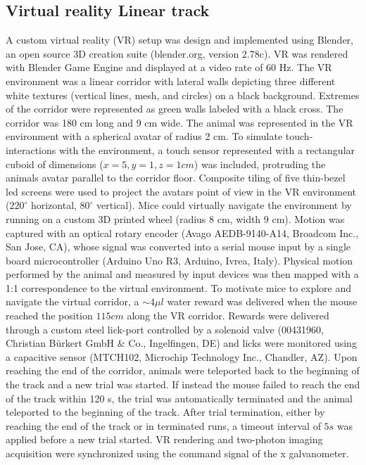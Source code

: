 \subsection{Virtual reality Linear track}
\label{chap3:sec:3:subsec1:linear-track-tracking}
A custom virtual reality (VR) setup was design and implemented using Blender, an open source 3D creation suite (blender.org, version 2.78c). 
VR was rendered with Blender Game Engine and displayed at a video rate of 60 Hz. 
The VR environment was a linear corridor with lateral walls depicting three different white textures (vertical lines, mesh, and circles) on a black background. 
Extremes of the corridor were represented as green walls labeled with a black cross.
The corridor was 180 cm long and 9 cm wide. 
The animal was represented in the VR environment with a spherical avatar of radius 2 cm.
To simulate touch-interactions with the environment, a touch sensor represented with a rectangular cuboid of dimensions ($x = 5, y = 1, z = 1 cm$) was included, protruding the animals avatar parallel to the corridor floor.
Composite tiling of five thin-bezel led screens were used to project the avatars point of view in the VR environment ($220^{\circ}$ horizontal, $80^{\circ}$ vertical). 
Mice could virtually navigate the environment by running on a custom 3D printed wheel (radius 8 cm, width 9 cm). 
Motion was captured with an optical rotary encoder (Avago AEDB-9140-A14, Broadcom Inc., San Jose, CA), whose signal was converted into a serial mouse input by a single board microcontroller (Arduino Uno R3, Arduino, Ivrea, Italy). 
Physical motion performed by the animal and measured by input devices was then mapped with a 1:1 correspondence to the virtual environment. 
To motivate mice to explore and navigate the virtual corridor, a $\sim 4 \mu l$ water reward was delivered when the mouse reached the position $115 cm$ along the VR corridor. 
Rewards were delivered through a custom steel lick-port controlled by a solenoid valve (00431960, Christian Bürkert GmbH \& Co., Ingelfingen, DE) and licks were monitored using a capacitive sensor (MTCH102, Microchip Technology Inc., Chandler, AZ). 
Upon reaching the end of the corridor, animals were teleported back to the beginning of the track and a new trial was started.
If instead the mouse failed to reach the end of the track within 120 s, the trial was automatically terminated and the animal teleported to the beginning of the track. 
After trial termination, either by reaching the end of the track or in terminated runs,  a timeout interval of $5 s$ was applied before a new trial started.
VR rendering and two-photon imaging acquisition were synchronized using the command signal of the x galvanometer.

